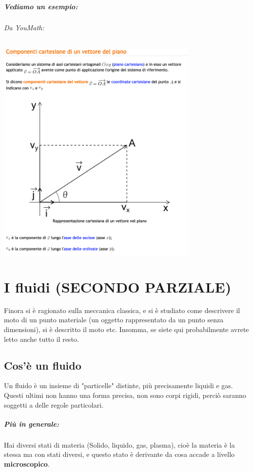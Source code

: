 \documentclass[12pt, a4paper, openany, oneside]{book}
\begin{document}
\paragraph{Vediamo un esempio:}
\subparagraph{Da YouMath:}	
\begin{center}
\includegraphics[width=0.75\textwidth]{componenti}
\end{center}
\chapter{I fluidi (SECONDO PARZIALE)}
Finora si è ragionato sulla meccanica classica, e si è studiato come descrivere
il moto di un punto materiale (un oggetto rappresentato da un punto senza
dimensioni), si è descritto il moto etc. Insomma, se siete qui probabilmente 
avrete letto anche tutto il resto. 
\section{Cos'è un fluido}
Un fluido è un insieme di "particelle" distinte, più precisamente liquidi e gas.
Questi ultimi non hanno una forma precisa, non sono corpi rigidi, perciò saranno
soggetti a delle regole particolari. 
\paragraph{Più in generale: }
Hai diversi stati di materia (Solido, liquido, gas, plasma), cioè la materia è 
la stessa ma con stati diversi, e questo stato è derivante da cosa accade a 
livello \textbf{microscopico}.
\end{document}
